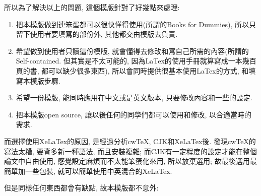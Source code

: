 
{}
所以為了解決以上的問題, 這個模版針對了好幾點來處理:

\begin{enumerate}

  \item
  {
    把本模版做到連笨蛋都可以很快懂得使用(所謂的Books for Dummies), 所以只留下使用者要填寫的部份外, 其他都交由模版去負責.
  } %

  \item
  {
    希望做到使用者只讀這份模版, 就會懂得去修改和寫自己所需的內容(所謂的Self-contained. 但其實是不太可能的, 因為LaTex的使用手冊就算寫成一本幾百頁的書, 都可以缺少很多東西), 所以會同時提供很基本使用LaTex的方式, 和填寫本模版步驟.
  } %

  \item
  {
    希望一份模版, 能同時應用在中文或是英文版本, 只要修改內容和一些的設定.
  } %

  \item
  {
    把本模版open source, 讓以後任何的同學們都可以使用和修改, 以合適當時的需求.
  } %

\end{enumerate}

而選擇使用XeLaTex的原因, 是經過分析cwTeX, CJK和XeLaTex後. 發現cwTeX的寫法太糟, 要背多新一種語法, 而且安裝複雜; 而CJK有一定程度的設定才能在整個論文中自由使用, 感覺設定麻煩而不太能笨蛋化來用, 所以放棄選用; 故最後選用最簡單加一些包裝, 就可以簡單使用中英混合的XeLaTex.


但是同樣任何東西都會有缺點, 故本模版都不意外:

